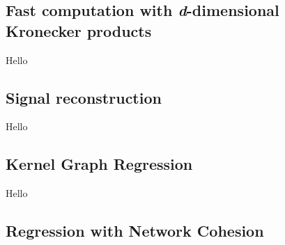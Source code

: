 \subsection{Fast computation with \textit{d}-dimensional Kronecker products}

Hello

\subsection{Signal reconstruction}

Hello

\subsection{Kernel Graph Regression}

Hello

\subsection{Regression with Network Cohesion}


